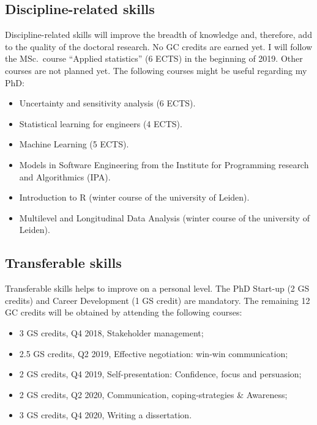 \subsection{Discipline-related skills}
\label{sec:d skills}

Discipline-related skills will improve the breadth of knowledge and, therefore, add to the quality of the doctoral research. No GC credits are earned yet. I will follow the MSc.\ course ``Applied statistics'' (6 ECTS) in the beginning of 2019. Other courses are not planned yet. The following courses might be useful regarding my PhD:
\begin{itemize}
	\item Uncertainty and sensitivity analysis (6 ECTS).
	\item Statistical learning for engineers (4 ECTS).
	\item Machine Learning (5 ECTS).
	\item Models in Software Engineering from the Institute for Programming research and Algorithmics (IPA).
	\item Introduction to R (winter course of the university of Leiden).
	\item Multilevel and Longitudinal Data Analysis (winter course of the university of Leiden).
\end{itemize}

\subsection{Transferable skills}
\label{sec:t skills}

Transferable skills helps to improve on a personal level. The PhD Start-up (2 GS credits) and Career Development (1 GS credit) are mandatory. The remaining 12 GC credits will be obtained by attending the following courses:
\begin{itemize}
	\item 3 GS credits, Q4 2018, Stakeholder management;
	\item 2.5 GS credits, Q2 2019, Effective negotiation: win-win communication;
	\item 2 GS credits, Q4 2019, Self-presentation: Confidence, focus and persuasion;
	\item 2 GS credits, Q2 2020, Communication, coping-strategies \& Awareness;
	\item 3 GS credits, Q4 2020, Writing a dissertation.
\end{itemize}
